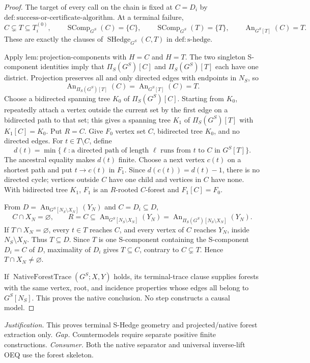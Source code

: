 \documentclass{article}
\begin{document}
\begin{proof}
The target of every call on the chain is fixed at \(C=D_i\) by \(\mathrm{def:success\text{-}or\text{-}certificate\text{-}algorithm}\). At a terminal failure,
\[
 C\subsetneq T\subseteq T_i^{(0)},\qquad
 \operatorname{SComp}_{G^S}(C)=\{C\},\qquad
 \operatorname{SComp}_{G^S}(T)=\{T\},\qquad
 \operatorname{An}_{G^S[T]}(C)=T.
\]
These are exactly the clauses of \(\operatorname{SHedge}_{G^S}(C,T)\) in \(\mathrm{def:s\text{-}hedge}\).

Apply \(\mathrm{lem:projection\text{-}components}\) with \(H=C\) and \(H=T\). The two singleton S-component identities imply that \(\Pi_S(G^S)[C]\) and \(\Pi_S(G^S)[T]\) each have one district. Projection preserves all and only directed edges with endpoints in \(N_S\), so
\[
 \operatorname{An}_{\Pi_S(G^S)[T]}(C)
 =\operatorname{An}_{G^S[T]}(C)=T.
\]
Choose a bidirected spanning tree \(K_0\) of \(\Pi_S(G^S)[C]\). Starting from \(K_0\), repeatedly attach a vertex outside the current set by the first edge on a bidirected path to that set; this gives a spanning tree \(K_1\) of \(\Pi_S(G^S)[T]\) with \(K_1[C]=K_0\). Put \(R=C\). Give \(F_0\) vertex set \(C\), bidirected tree \(K_0\), and no directed edges. For \(t\in T\setminus C\), define
\[
 d(t)=\min\{\ell:\text{a directed path of length }\ell
 \text{ runs from }t\text{ to }C\text{ in }G^S[T]\}.
\]
The ancestral equality makes \(d(t)\) finite. Choose a next vertex \(c(t)\) on a shortest path and put \(t\to c(t)\) in \(F_1\). Since \(d(c(t))=d(t)-1\), there is no directed cycle; vertices outside \(C\) have one child and vertices in \(C\) have none. With bidirected tree \(K_1\), \(F_1\) is an \(R\)-rooted \(C\)-forest and \(F_1[C]=F_0\).

From \(D=\operatorname{An}_{G^S[N_S\setminus X_N]}(Y_N)\) and \(C=D_i\subseteq D\),
\[
 C\cap X_N=\varnothing,\qquad
 R=C\subseteq\operatorname{An}_{G^S[N_S\setminus X_N]}(Y_N)
 =\operatorname{An}_{\Pi_S(G^S)[N_S\setminus X_N]}(Y_N).
\]
If \(T\cap X_N=\varnothing\), every \(t\in T\) reaches \(C\), and every vertex of \(C\) reaches \(Y_N\), inside \(N_S\setminus X_N\). Thus \(T\subseteq D\). Since \(T\) is one S-component containing the S-component \(D_i=C\) of \(D\), maximality of \(D_i\) gives \(T\subseteq C\), contrary to \(C\subsetneq T\). Hence \(T\cap X_N\ne\varnothing\).

If \(\operatorname{NativeForestTrace}(G^S;X,Y)\) holds, its terminal-trace clause supplies forests with the same vertex, root, and incidence properties whose edges all belong to \(G^S[N_S]\). This proves the native conclusion. No step constructs a causal model.
\end{proof}
\par\smallskip\noindent \textit{Justification.} This proves terminal S-Hedge geometry and projected/native forest extraction only. \textit{Gap.} Countermodels require separate positive finite constructions. \textit{Consumer.} Both the native separator and universal inverse-lift OEQ use the forest skeleton.
\end{document}
